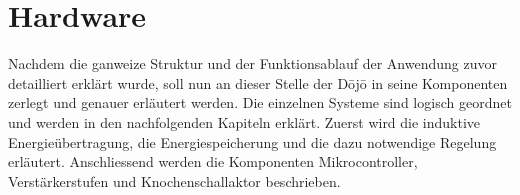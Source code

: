 \section{Hardware}\label{sec:hardware}

Nachdem die ganweize Struktur und der Funktionsablauf der Anwendung zuvor detailliert erklärt wurde, soll nun an dieser Stelle der Dōjō in seine Komponenten zerlegt und genauer erläutert werden. Die einzelnen Systeme sind logisch geordnet und werden in den nachfolgenden Kapiteln erklärt. Zuerst wird die induktive Energieübertragung, die Energiespeicherung und die dazu notwendige Regelung erläutert. Anschliessend werden die Komponenten Mikrocontroller, Verstärkerstufen und Knochenschallaktor beschrieben.